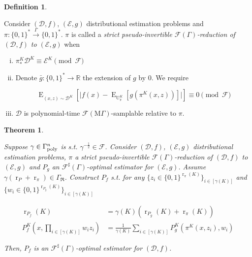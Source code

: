\documentclass{article}
\numberwithin{equation}{section}
\theoremstyle{definition}
\newtheorem{definition}{Definition}[section]
\theoremstyle{plain}
\newtheorem{theorem}{Theorem}[section]
\newcommand{\Bool}{\{0,1\}}
\newcommand{\Words}{{\Bool^*}}
\DeclareMathOperator{\E}{E}
\DeclareMathOperator{\R}{r}
\DeclareMathOperator{\Un}{U}
\newcommand{\Reals}{\mathbb{R}}
\newcommand{\Abs}[1]{\lvert #1 \rvert}
\newcommand{\Dist}{\mathcal{D}}
\newcommand{\GrowR}{\Gamma_{\mathfrak{R}}}
\newcommand{\MGrow}{\mathrm{M}\Gamma}
\newcommand{\Fall}{\mathcal{F}}
\newcommand{\EG}{\Fall(\Gamma)}
\newcommand{\ESG}{\Fall^\sharp(\Gamma)}
\newcommand{\EMG}{\Fall(\MGrow)}
\newcommand{\BoolR}[1]{\Bool^{\R_{#1}(K)}}
\newcommand{\GammaPoly}{\Gamma_{\textnormal{poly}}}
\newcommand{\Scheme}{\xrightarrow{\Gamma}}
\begin{document}
\begin{samepage}
\begin{definition}
\label{def:sp_reduce}

Consider $(\Dist,f)$, $(\mathcal{E},g)$ distributional estimation problems and ${\pi: \Words \Scheme \Words}$. $\pi$ is called a \emph{strict pseudo-invertible $\EG$-reduction of $(\Dist,f)$ to $(\mathcal{E},g)$} when

\begin{enumerate}[(i)]

\item\label{con:def__sp_reduce__dist} $\pi_*^K\Dist^{K} \equiv \mathcal{E}^{K} \pmod \Fall$

\item\label{con:def__sp_reduce__fun} Denote ${\bar{g}: \Words \rightarrow \Reals}$ the extension of $g$ by 0. We require

\[\E_{(x,z) \sim \Dist^{K}}[\Abs{f(x)-\E_{\Un_\pi^{K}}[g(\pi^{K}(x,z))]}] \equiv 0 \pmod \Fall\]

\item\label{con:def__sp_reduce__smp} $\Dist$ is polynomial-time $\EMG$-samplable relative to $\pi$.

\end{enumerate}

\end{definition}
\end{samepage}

\begin{samepage}
\begin{theorem}
\label{thm:sp_reduce_sharp}

Suppose $\gamma \in \GammaPoly^n$ is s.t. $\gamma^{-\frac{1}{2}} \in \Fall$. Consider $(\Dist,f)$, $(\mathcal{E},g)$ distributional estimation problems, $\pi$ a strict pseudo-invertible $\EG$-reduction of $(\Dist, f)$ to $(\mathcal{E}, g)$ and $P_g$ an $\ESG$-optimal estimator for $(\mathcal{E}, g)$. Assume $\gamma (\R_P + \R_\pi) \in \GrowR$. Construct ${P_f}$ s.t. for any ${\{z_i \in \BoolR{\pi}\}_{i \in [\gamma(K)]}}$ and ${\{w_i \in \BoolR{P_g}\}_{i \in [\gamma(K)]}}$

\begin{align}
\label{eqn:thm__sp_reduce__rpf}\R_{P_f}(K) &= \gamma(K) (\R_{P_g}(K) + \R_\pi(K)) \\
\label{eqn:thm__sp_reduce__pf}P_f^K(x, \prod_{i \in [\gamma(K)]} w_i z_i) &= \frac{1}{\gamma(K)}\sum_{i \in [\gamma(K)]} P_g^K(\pi^K(x,z_i),w_i)
\end{align}

Then, $P_f$ is an $\ESG$-optimal estimator for $(\Dist, f)$.

\end{theorem}
\end{samepage}
\end{document}
